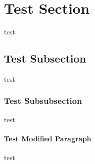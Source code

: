 \documentclass{article}
\begin{document}
\section{Test Section}
test
\subsection{Test Subsection}
test
\subsubsection{Test Subsubsection}
test
\paragraph{Test Modified Paragraph}
test
\end{document}
